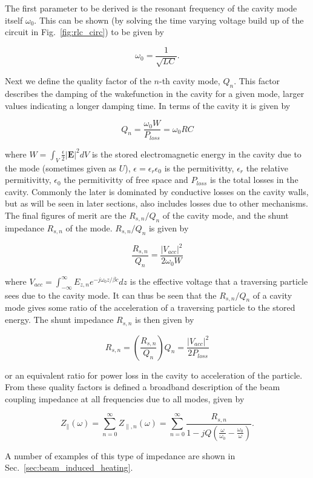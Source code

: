 The first parameter to be derived is the resonant frequency of the cavity mode itself $\omega_{0}$. This can be shown (by solving the time varying voltage build up of the circuit in Fig.~\ref{fig:rlc_circ}) to be given by

\begin{equation}
\omega_{0} = \frac{1}{\sqrt{LC}}.
\end{equation}

Next we define the quality factor of the $n$-th cavity mode, $Q_{n}$. This factor describes the damping of the wakefunction in the cavity for a given mode, larger values indicating a longer damping time. In terms of the cavity it is given by

\begin{equation}
Q_{n} = \frac{\omega_{0} W}{P_{loss}} = \omega_{0}RC
\end{equation}

where $W = \int_{V} \frac{\epsilon}{2} \left| \mathbf{E} \right|^{2} dV$ is the stored electromagnetic energy in the cavity due to the mode (sometimes given as $U$), $\epsilon = \epsilon_{r}\epsilon_{0}$ is the permitivitty, $\epsilon_{r}$ the relative permitivitty, $\epsilon_{0}$ the permitivitty of free space and $P_{loss}$ is the total losses in the cavity. Commonly the later is dominated by conductive losses on the cavity walls, but as will be seen in later sections, also includes losses due to other mechanisms. The final figures of merit are the $R_{s, n}/Q_{n}$ of the cavity mode, and the shunt impedance $R_{s, n}$ of the mode. $R_{s, n}/Q_{n}$ is given by

\begin{equation}
\frac{R_{s, n}}{Q_{n}} = \frac{\left| V_{acc} \right|^{2}}{2 \omega_{0} W}
\end{equation}

where $V_{acc} = \int^{\infty}_{-\infty} E_{z, n} e^{-j \omega_{0} z/ \beta{}c} dz$ is the effective voltage that a traversing particle sees due to the cavity mode. It can thus be seen that the $R_{s, n}/Q_{n}$ of a cavity mode gives some ratio of the acceleration of a traversing particle to the stored energy. The shunt impedance $R_{s, n}$ is then given by

\begin{equation}
R_{s, n} = \left(  \frac{R_{s, n}}{Q_{n}} \right) Q_{n} = \frac{\left| V_{acc} \right|^{2}}{2 P_{loss}}
\end{equation}

or an equivalent ratio for power loss in the cavity to acceleration of the particle. From these quality factors is defined a broadband description of the beam coupling impedance at all frequencies due to all modes, given by

\begin{equation}
Z_{\parallel} \left( \omega \right) = \displaystyle\sum\limits_{n = 0}^{\infty} Z_{\parallel, n} \left( \omega \right) = \displaystyle\sum\limits_{n = 0}^{\infty} \frac{R_{s, n}}{1 - jQ \left( \frac{\omega}{\omega_{0}} - \frac{\omega_{0}}{\omega} \right)}.
\end{equation}

A number of examples of this type of impedance are shown in Sec.~\ref{sec:beam_induced_heating}.